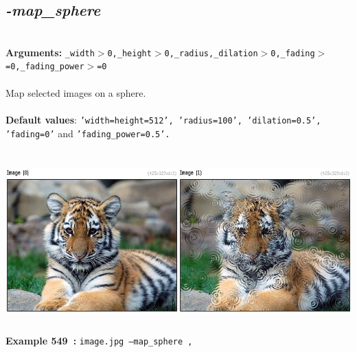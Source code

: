\documentclass[a4paper,11pt,twoside]{book}
\begin{document}
\subsection{\emph{-map\_sphere} }\vspace*{-0.5em}
~\\\textbf{Arguments: } 
{\small \texttt{\_width$>$0,\_height$>$0,\_radius,\_dilation$>$0,\_fading$>$=0,\_fading\_power$>$=0}}\\~\\
Map selected images on a sphere.
~\\~\\\textbf{Default values}: {\small \texttt{'width=height=512', 'radius=100', 'dilation=0.5', 'fading=0'} and \texttt{'fading\_power=0.5'.}}
\begin{center}\includegraphics[keepaspectratio=true,height=7cm,width=\textwidth]{img/gmic_def549.jpg}\\
{\footnotesize \textbf{Example 549~:} \texttt{image.jpg --map\_sphere ,}}
\end{center}
\end{document}

